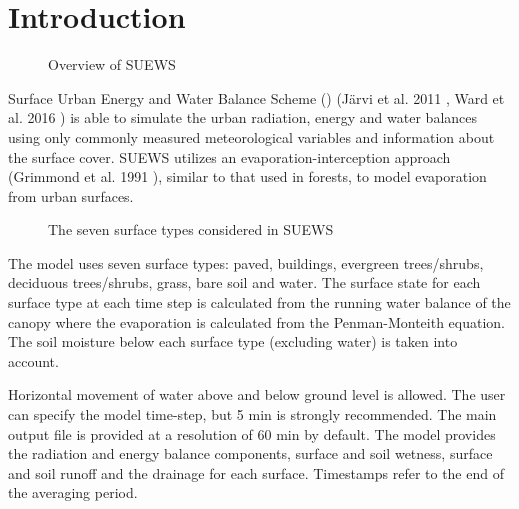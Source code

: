 \documentclass[letterpaper,10pt,english]{sphinxmanual}
\begin{document}

\endgroup


\chapter{Introduction}
\label{\detokenize{introduction:introduction}}\label{\detokenize{introduction::doc}}
\begin{figure}[htbp]
\centering
\capstart

\noindent{}
\caption{Overview of SUEWS}\label{\detokenize{introduction:id4}}\end{figure}

Surface Urban Energy and Water Balance Scheme () (Järvi et al.
2011 \label{\detokenize{introduction:id1}}{\hyperref[\detokenize{references:j11}]{\sphinxcrossref{{[}J11{]}}}}, Ward et al. 2016 \label{\detokenize{introduction:id2}}{\hyperref[\detokenize{references:w16}]{\sphinxcrossref{{[}W16{]}}}}) is able to simulate the urban
radiation, energy and water balances using only commonly measured
meteorological variables and information about the surface cover. SUEWS
utilizes an evaporation-interception approach (Grimmond et al.
1991 \label{\detokenize{introduction:id3}}{\hyperref[\detokenize{references:g91}]{\sphinxcrossref{{[}G91{]}}}}), similar to that used in forests, to model evaporation from
urban surfaces.

\begin{figure}[htbp]
\centering
\capstart

\noindent{}
\caption{The seven surface types considered in SUEWS}\label{\detokenize{introduction:id5}}\end{figure}

The model uses seven surface types: paved, buildings, evergreen
trees/shrubs, deciduous trees/shrubs, grass, bare soil and water. The
surface state for each surface type at each time step is calculated from
the running water balance of the canopy where the evaporation is
calculated from the Penman-Monteith equation. The soil moisture below
each surface type (excluding water) is taken into account.

Horizontal movement of water above and below ground level is allowed.
The user can specify the model time-step, but 5 min is strongly
recommended. The main output file is provided at a resolution of 60 min
by default. The model provides the radiation and energy balance
components, surface and soil wetness, surface and soil runoff and the
drainage for each surface. Timestamps refer to the end of the averaging
period.
\end{document}
